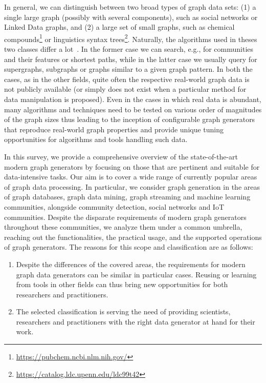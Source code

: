 In general, we can distinguish between two broad types of graph data sets: (1) a single large graph (possibly with several components), such as social networks  or Linked Data graphs, and (2) a large set of small graphs, such as chemical compounds\footnote{\url{https://pubchem.ncbi.nlm.nih.gov/}} or linguistics syntax trees\footnote{\url{https://catalog.ldc.upenn.edu/ldc99t42}}. Naturally, the algorithms used in theses two classes differ a lot~\cite{DBLP:books/igi/Sakr2011}. In the former case we can search, e.g., for communities and their features or shortest paths, while in the latter case we usually query for supergraphs, subgraphs or graphs similar to a given graph pattern. In both the cases, as in the other fields, quite often the respective real-world graph data is not publicly available (or simply does not exist when a particular method for data manipulation is proposed).
Even in the cases in which real data is abundant, many algorithms and techniques need to be tested on various order of magnitudes of the graph sizes thus leading to the inception of
configurable graph generators that reproduce real-world graph properties and provide unique tuning opportunities for
algorithms and tools handling such data.

In this survey, we provide a comprehensive overview of the state-of-the-art
modern
graph generators by focusing on those that are pertinent and suitable for
data-intensive tasks. Our aim is to cover a wide range of currently popular
areas of graph data processing. In particular, we consider graph generation
in the areas of graph databases, graph data mining, graph streaming and
machine learning communities, alongside community detection, social
networks and IoT communities. Despite the disparate requirements of modern graph generators throughout these communities, we analyze them under a common umbrella, reaching out the functionalities, the practical usage, and the supported operations of graph generators. The reasons for this scope and classification are as follows:

\begin{enumerate}
  \item Despite the differences of the covered areas, the requirements for
modern graph data generators can be similar in particular cases. Reusing or learning from tools in other fields can thus bring new opportunities for both researchers and practitioners.
  \item The selected classification is serving the need of providing scientists, researchers and practitioners with the right data generator at hand for their work.
\end{enumerate}

